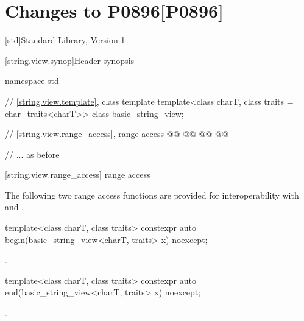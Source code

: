 
\part[Changes to P0896]{Changes to P0896\hfill[P0896]}\label{P0896}

\setcounter{chapter}{19}
[std]{Standard Library, Version 1}
\setcounter{SectionDepthBase}{1}
\setcounter{section}{6}
\setcounter{subsection}{4}


[string.view.synop]{Header  synopsis}


%
\begin{codeblock}
namespace std {
  // \ref{string.view.template}, class template 
  template<class charT, class traits = char_traits<charT>>
  class basic_string_view;

  // \ref{string.view.range_access},  range access
  @@
    @@
  @@
    @@

  // ... as before
}
\end{codeblock}


\begin{addedblock}
\setcounter{subsubsection}{2}
[string.view.range_access]{ range access}

\pnum
\enternote The following two range access functions are provided for interoperability with
 and .\exitnote

%
\begin{itemdecl}
template<class charT, class traits>
  constexpr auto begin(basic_string_view<charT, traits> x) noexcept;
\end{itemdecl}

\begin{itemdescr}
\pnum
\returns {}.
\end{itemdescr}

%
\begin{itemdecl}
template<class charT, class traits>
  constexpr auto end(basic_string_view<charT, traits> x) noexcept;
\end{itemdecl}

\begin{itemdescr}
\pnum
\returns {}.
\end{itemdescr}
\end{addedblock}

